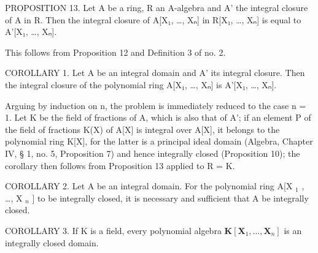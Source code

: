 PROPOSITION 13. Let A be a ring, R an A-algebra and A' the integral closure of A in R. Then the integral closure of A{[}X₁, \ldots, Xₙ{]} in R{[}X₁, \ldots, Xₙ{]} is equal to A'{[}X₁, \ldots, Xₙ{]}.

This follows from Proposition 12 and Definition 3 of no. 2.

COROLLARY 1. Let A be an integral domain and A' its integral closure. Then the integral closure of the polynomial ring A{[}X₁, \ldots, Xₙ{]} is A'{[}X₁, \ldots, Xₙ{]}.

Arguing by induction on n, the problem is immediately reduced to the case n = 1. Let K be the field of fractions of A, which is also that of A'; if an element P of the field of fractions K(X) of A{[}X{]} is integral over A{[}X{]}, it belongs to the polynomial ring K{[}X{]}, for the latter is a principal ideal domain (Algebra, Chapter IV, § 1, no. 5, Proposition 7) and hence integrally closed (Proposition 10); the corollary then follows from Proposition 13 applied to R = K.

COROLLARY 2. Let A be an integral domain. For the polynomial ring A{[}X \(_{1}\) , \ldots, X \(_{n}\) {]} to be integrally closed, it is necessary and sufficient that A be integrally closed.

COROLLARY 3. If K is a field, every polynomial algebra \(\mathbf{K}[\mathbf{X}_1,\ldots ,\mathbf{X}_n]\) is an integrally closed domain.

